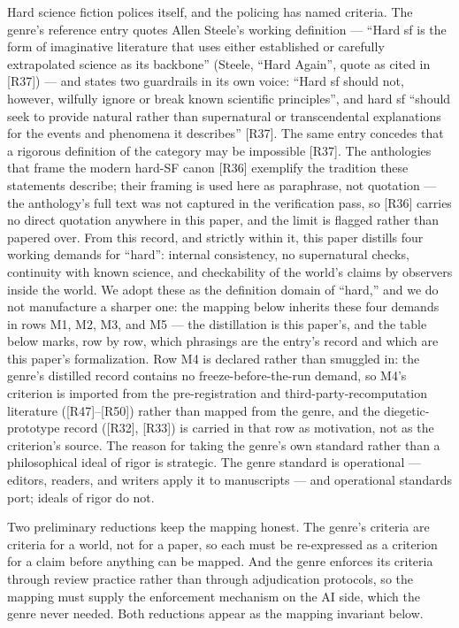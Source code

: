 \documentclass[11pt,a4paper]{article}
\begin{document}
Hard science fiction polices itself, and the policing has named criteria. The genre's reference entry quotes Allen Steele's working definition — ``Hard sf is the form of imaginative literature that uses either established or carefully extrapolated science as its backbone'' (Steele, ``Hard Again'', quote as cited in [R37]) — and states two guardrails in its own voice: ``Hard sf should not, however, wilfully ignore or break known scientific principles'', and hard sf ``should seek to provide natural rather than supernatural or transcendental explanations for the events and phenomena it describes'' [R37]. The same entry concedes that a rigorous definition of the category may be impossible [R37]. The anthologies that frame the modern hard-SF canon [R36] exemplify the tradition these statements describe; their framing is used here as paraphrase, not quotation — the anthology's full text was not captured in the verification pass, so [R36] carries no direct quotation anywhere in this paper, and the limit is flagged rather than papered over. From this record, and strictly within it, this paper distills four working demands for ``hard'': internal consistency, no supernatural checks, continuity with known science, and checkability of the world's claims by observers inside the world. We adopt these as the definition domain of ``hard,'' and we do not manufacture a sharper one: the mapping below inherits these four demands in rows M1, M2, M3, and M5 — the distillation is this paper's, and the table below marks, row by row, which phrasings are the entry's record and which are this paper's formalization. Row M4 is declared rather than smuggled in: the genre's distilled record contains no freeze-before-the-run demand, so M4's criterion is imported from the pre-registration and third-party-recomputation literature ([R47]–[R50]) rather than mapped from the genre, and the diegetic-prototype record ([R32], [R33]) is carried in that row as motivation, not as the criterion's source. The reason for taking the genre's own standard rather than a philosophical ideal of rigor is strategic. The genre standard is operational — editors, readers, and writers apply it to manuscripts — and operational standards port; ideals of rigor do not.

Two preliminary reductions keep the mapping honest. The genre's criteria are criteria for a world, not for a paper, so each must be re-expressed as a criterion for a claim before anything can be mapped. And the genre enforces its criteria through review practice rather than through adjudication protocols, so the mapping must supply the enforcement mechanism on the AI side, which the genre never needed. Both reductions appear as the mapping invariant below.
\end{document}
